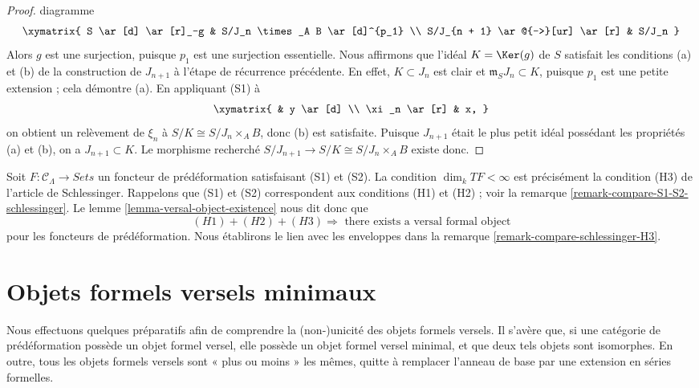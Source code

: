 \begin{proof}
diagramme
$$
\xymatrix{
S \ar[d] \ar[r]_-g  &  S/J_n \times_A B \ar[d]^{p_1} \\
S/J_{n + 1} \ar@{-->}[ur] \ar[r] &  S/J_n
}
$$
Alors $g$ est une surjection, puisque $p_1$ est une surjection essentielle.
Nous affirmons que l'idéal $K = \Ker(g)$ de $S$ satisfait les conditions (a)
et (b) de la construction de $J_{n + 1}$ à l'étape de récurrence précédente.
En effet, $K \subset J_n$ est clair et
$\mathfrak m_SJ_n \subset K$, puisque $p_1$ est une petite extension ; cela
démontre (a). En appliquant (S1) à
$$
\xymatrix{
            &  y \ar[d] \\
\xi_n \ar[r]  &  x,
}
$$
on obtient un relèvement de $\xi_n$ à
$S/K \cong S/J_n \times_A B$, donc (b) est satisfaite. Puisque $J_{n + 1}$
était le plus petit idéal possédant les propriétés (a) et (b), on a
$J_{n + 1} \subset K$. Le morphisme recherché
$S/J_{n+1} \to S/K \cong S/J_n \times_A B$ existe donc.
\end{proof}

\begin{remark}
\label{remark-compare-schlessinger-H3-pre}
Soit $F : \mathcal{C}_\Lambda \to \textit{Sets}$ un foncteur de
prédéformation satisfaisant (S1) et (S2). La condition
$\dim_k TF < \infty$ est précisément la condition (H3) de l'article de
Schlessinger. Rappelons que (S1) et (S2) correspondent aux conditions (H1) et
(H2) ; voir la remarque \ref{remark-compare-S1-S2-schlessinger}. Le lemme
\ref{lemma-versal-object-existence} nous dit donc que
$$
(H1) + (H2) + (H3)
\Rightarrow
\text{ there exists a versal formal object}
$$
pour les foncteurs de prédéformation. Nous établirons le lien avec les
enveloppes dans la remarque \ref{remark-compare-schlessinger-H3}.
\end{remark}





\section{Objets formels versels minimaux}
\label{section-minimal-versal}

\noindent
Nous effectuons quelques préparatifs afin de comprendre la (non-)unicité des
objets formels versels. Il s'avère que, si une catégorie de prédéformation
possède un objet formel versel, elle possède un objet formel versel minimal,
et que deux tels objets sont isomorphes. En outre, tous les objets formels
versels sont « plus ou moins » les mêmes, quitte à remplacer l'anneau de base
par une extension en séries formelles.

